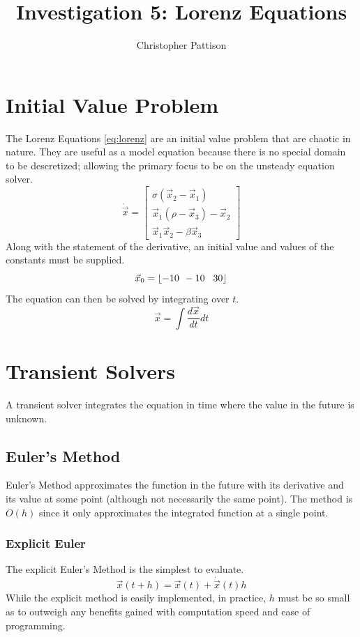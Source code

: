 \documentclass[12pt,twocolumn]{article}
\title{\vspace{-2.5em}Investigation 5: Lorenz Equations}
\author{Christopher Pattison}
\date{}
\begin{document}
\maketitle
\section*{Initial Value Problem}
The Lorenz Equations \eqref{eq:lorenz} are an initial value problem that are chaotic in nature.
They are useful as a model equation because there is no special domain to be descretized;
allowing the primary focus to be on the unsteady equation solver.
\begin{equation} \label{eq:lorenz}
\dot{\vec{x}} =
\begin{bmatrix}
\sigma (\vec{x}_2-\vec{x}_1) \\
\vec{x}_1 (\rho - \vec{x}_3) - \vec{x}_2 \\
\vec{x}_1 \vec{x}_2 - \beta \vec{x}_3
\end{bmatrix}
\end{equation}
Along with the statement of the derivative, an initial value and values of the constants must be
supplied.
\begin{equation}
\vec{x}_0 = \lfloor -10 \hspace{1ex} -10 \hspace{2ex} 30 \rfloor
\end{equation}
The equation can then be solved by integrating over $t$.
\begin{equation}
\vec{x} = \int \frac{d\vec{x}}{dt}dt
\end{equation}

\section*{Transient Solvers}
A transient solver integrates the equation in time where the value in the future is unknown.

\subsection*{Euler's Method}
Euler's Method approximates the function in the future with its derivative and its value at some point 
(although not necessarily the same point).
The method is $O(h)$ since it only approximates the integrated function at a single point.

\subsubsection*{Explicit Euler}
The explicit Euler's Method is the simplest to evaluate.
\begin{equation}
\vec x(t+h) = \vec x(t) + \dot{\vec{x}}(t)h
\end{equation}
While the explicit method is easily implemented, in practice, $h$ must be so small as to outweigh any 
benefits gained with computation speed and ease of programming.
\end{document}
